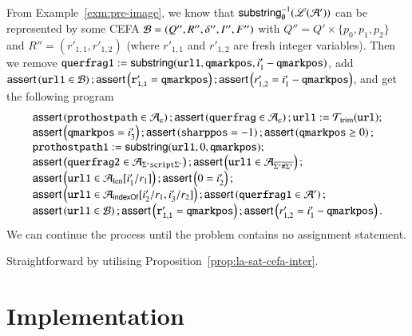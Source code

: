 {\begin{description}
		From Example~\ref{exm:pre-image}, we know that $\mathsf{substring}^{-1}_\emptyset(\mathscr{L}(\mathcal{A}'))$ can be represented by some CEFA $\mathcal{B}=(Q'', R'', \delta'', I'', F'')$ with $Q''= Q' \times \{p_0,p_1,p_2\}$ and $R''=(r'_{1,1}, r'_{1,2})$ (where $r'_{1,1}$ and $r'_{1,2}$ are fresh integer variables). Then we remove $\mathtt{querfrag1} := \mathsf{substring}(\mathtt{url1, qmarkpos}, i'_1 - \mathtt{qmarkpos})$, add $\textsf{assert}\left(\mathtt{url1} \in \mathcal{B}\right);\textsf{assert}\left(\mathtt{r'_{1,1}= qmarkpos}\right); \textsf{assert}\left(r'_{1,2}=i'_1 - \mathtt{qmarkpos}\right)$, and get the following program
		\[ 
		\begin{array}{l}
		\textsf{assert}\left(\mathtt{prothostpath} \in \mathcal{A}_\varepsilon\right); \textsf{assert}\left(\mathtt{querfrag} \in \mathcal{A}_\varepsilon\right); \mathtt{url1} := \mathcal{T}_{\rm trim}(\mathtt{url}); \\
		\textsf{assert}\left(\mathtt{qmarkpos} = i'_3\right); \textsf{assert}\left(\mathtt{sharppos} =-1 \right); \textsf{assert}\left(\mathtt{qmarkpos} \ge 0\right); \\ 
		\mathtt{prothostpath1} := \mathsf{substring}(\mathtt{url1}, 0, \mathtt{qmarkpos});\\
		\textsf{assert}\left(\mathtt{querfrag2} \in  \mathcal{A}_{\Sigma^*\mathtt{script}\Sigma^*}\right);  
		\textsf{assert}\left(\mathtt{url1} \in  \mathcal{A}_{\overline{\Sigma^*\#\Sigma^*}}\right); \\
		\textsf{assert}\left(\mathtt{url1} \in \mathcal{A}_{\rm len}[i'_1/r_1]\right);  \textsf{assert}\left(0= i'_2\right); \\
		\textsf{assert}\left(\mathtt{url1} \in \mathcal{A}_{\mathsf{indexOf}}[i'_2/r_1, i'_3/r_2]\right);  \textsf{assert}\left(\mathtt{querfrag1} \in \mathcal{A}'\right);\\
		\textsf{assert}\left(\mathtt{url1} \in \mathcal{B}\right);\textsf{assert}\left(\mathtt{r'_{1,1} = qmarkpos} \right); \textsf{assert}\left(r'_{1,2}=i'_1 - \mathtt{qmarkpos}\right).
		\end{array}
		\]
		We can continue the process until the problem contains no assignment statement.
		\item[Step V.]  Straightforward by utilising Proposition~\ref{prop:la-sat-cefa-inter}. 
	\end{description}
}


\section{Implementation} \label{appendix:impl}
%








